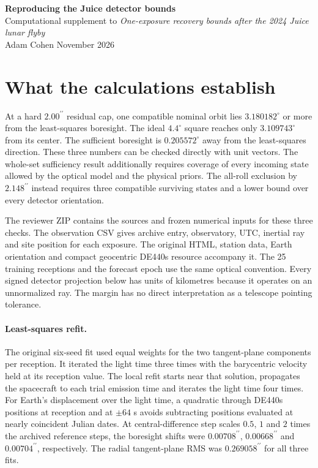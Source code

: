 \documentclass[10pt,letterpaper]{article}
\newcommand{\as}{^{\prime\prime}}
\begin{document}
\begin{center}
{\LARGE\bfseries Reproducing the Juice detector bounds}\\[5pt]
{\large Computational supplement to \emph{One-exposure recovery bounds after the 2024 Juice lunar flyby}}\\[5pt]
Adam Cohen  November 2026
\end{center}

\section{What the calculations establish}
At a hard $2.00\as$ residual cap, one compatible nominal orbit lies $3.180182^\circ$ or more from the least-squares boresight. The ideal $4.4^\circ$ square reaches only $3.109743^\circ$ from its center. The sufficient boresight is $0.205572^\circ$ away from the least-squares direction. These three numbers can be checked directly with unit vectors. The whole-set sufficiency result additionally requires coverage of every incoming state allowed by the optical model and the physical priors. The all-roll exclusion by $2.148\as$ instead requires three compatible surviving states and a lower bound over every detector orientation.

The reviewer ZIP contains the sources and frozen numerical inputs for these three checks. The observation CSV gives archive entry, observatory, UTC, inertial ray and site position for each exposure. The original HTML, station data, Earth orientation and compact geocentric DE440s resource accompany it. The 25 training receptions and the forecast epoch use the same optical convention. Every signed detector projection below has units of kilometres because it operates on an unnormalized ray. The margin has no direct interpretation as a telescope pointing tolerance.

\paragraph{Least-squares refit.}
The original six-seed fit used equal weights for the two tangent-plane components per reception. It iterated the light time three times with the barycentric velocity held at its reception value. The local refit starts near that solution, propagates the spacecraft to each trial emission time and iterates the light time four times. For Earth's displacement over the light time, a quadratic through DE440s positions at reception and at $\pm64$ s avoids subtracting positions evaluated at nearly coincident Julian dates. At central-difference step scales $0.5$, $1$ and $2$ times the archived reference steps, the boresight shifts were $0.00708\as$, $0.00668\as$ and $0.00704\as$, respectively. The radial tangent-plane RMS was $0.269058\as$ for all three fits.
\end{document}
